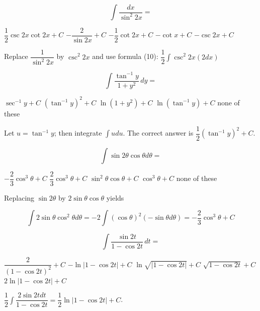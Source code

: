 \question
\[
\displaystyle\int \dfrac{d x}{\sin ^{2} 2 x}=
\]
\begin{choices}
  \choice $\dfrac{1}{2} \csc 2 x \cot 2 x+C$
  \choice $-\dfrac{2}{\sin 2 x}+C$
  \CorrectChoice $-\dfrac{1}{2} \cot 2 x+C$
  \choice $-\cot x+C$
  \choice $-\csc 2 x+C$
\end{choices}
\begin{solution}
Replace $\dfrac{1}{\sin ^{2} 2 x}$ by $\csc ^{2} 2 x$ and use formula (10): $\dfrac{1}{2} \displaystyle\int \csc ^{2} 2 x(2 d x)$
\end{solution}




\newpage


\question
\[
\displaystyle\int \dfrac{\tan ^{-1} y}{1+y^{2}} \,dy=
\]
\begin{choices}
  \choice $\sec ^{-1} y+C$
  \choice $\left(\tan ^{-1} y\right)^{2}+C$
  \choice $\ln \left(1+y^{2}\right)+C$
  \choice $\ln \left(\tan ^{-1} y\right)+C$
  \CorrectChoice none of these
\end{choices}
\begin{solution}
Let $u=\tan ^{-1} y$; then integrate $\displaystyle\int u d u$. The correct answer is $\dfrac{1}{2}\left(\tan ^{-1} y\right)^{2}+C$.
\end{solution}

\question
\[
\displaystyle\int \sin 2 \theta \cos \theta d \theta=
\]
\begin{choices}
  \CorrectChoice $-\dfrac{2}{3} \cos ^{3} \theta+C$
  \choice $\dfrac{2}{3} \cos ^{3} \theta+C$
  \choice $\sin ^{2} \theta \cos \theta+C$
  \choice $\cos ^{3} \theta+C$
  \choice none of these
\end{choices}
\begin{solution}
Replacing $\sin 2 \theta$ by $2 \sin \theta \cos \theta$ yields


\[
\displaystyle\int 2 \sin \theta \cos ^{2} \theta d \theta=-2 \displaystyle\int(\cos \theta)^{2}(-\sin \theta d \theta)=-\dfrac{2}{3} \cos ^{3} \theta+C
\]
\end{solution}

\question
\[
\displaystyle\int \dfrac{\sin 2 t}{1-\cos 2 t} \,dt=
\]
\begin{choices}
  \choice $\dfrac{2}{(1-\cos 2 t)^{2}}+C$
  \choice $-\ln |1-\cos 2 t|+C$
  \CorrectChoice $\ln \sqrt{|1-\cos 2 t|}+C$
  \choice $\sqrt{1-\cos 2 t}+C$
  \choice $2 \ln |1-\cos 2 t|+C$
\end{choices}
\begin{solution}
$\dfrac{1}{2} \displaystyle\int \dfrac{2 \sin 2 t d t}{1-\cos 2 t}=\dfrac{1}{2} \ln |1-\cos 2 t|+C$.
\end{solution}


